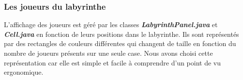 \subsubsection*{Les joueurs du labyrinthe}

L'affichage des joueurs est géré par les classes \textbf{\textit{LabyrinthPanel.java}} et \textbf{\textit{Cell.java}} en fonction de leurs positions dans le labyrinthe. Ils sont représentés par des rectangles de couleurs différentes qui changent de taille en fonction du nombre de joueurs présents sur une seule case. Nous avons choisi cette représentation car elle est simple et facile à comprendre d'un point de vu ergonomique.

\begin{figure}[!htb]
    \centering
    \qquad

\end{figure}
